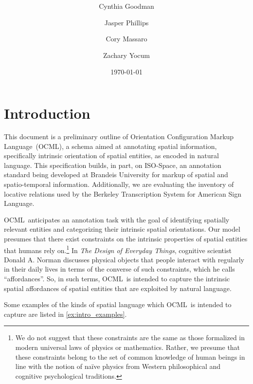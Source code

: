 \documentclass[11pt]{article}
\title{\nameML\\
{\Large \version}}
\author{
    Cynthia Goodman\\
    \and
    Jasper Phillips\\
    \and
    Cory Massaro\\
    \and
    Zachary Yocum\\
}
\date{\today}
\newcommand{\nameML}{Orientation Configuration Markup Language}
\newcommand{\ML}{OCML}
\begin{document}
\maketitle

\tableofcontents 

\newpage

\section{Introduction} %
\label{sec:introduction}

This document is a preliminary outline of \nameML~(\ML), a schema aimed at annotating spatial information, specifically intrinsic orientation of spatial entities, as encoded in natural language. This specification builds, in part, on ISO-Space\cite{pustejovsky_moszkowicz:2011}, an annotation standard being developed at Brandeis University for markup of spatial and spatio-temporal information. Additionally, we are evaluating the inventory of locative relations used by the Berkeley Transcription System\cite{slobin:1999} for American Sign Language.

\ML~anticipates an annotation task with the goal of identifying spatially relevant entities and categorizing their intrinsic spatial orientations. Our model presumes that there exist constraints on the intrinsic properties of spatial entities that humans rely on.\footnote{We do not suggest that these constraints are the same as those formalized in modern universal laws of physics or mathematics. Rather, we presume that these constraints belong to the set of common knowledge of human beings in line with the notion of na\"ive physics from Western philosophical and cognitive psychological traditions.} In \emph{The Design of Everyday Things}\cite{norman:2002}, cognitive scientist Donald A. Norman discusses physical objects that people interact with regularly in their daily lives in terms of the converse of such constraints, which he calls ``affordances''. So, in such terms, \ML~is intended to capture the intrinsic spatial affordances of spatial entities that are exploited by natural language.

Some examples of the kinds of spatial language which \ML~is intended to capture are listed in \cref{ex:intro_examples}.

\label{ex:intro_examples}
\end{document}
